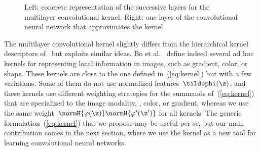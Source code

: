 \begin{figure}
{
      \label{subfig:cnn}
   }
   \vspace*{-0.3cm}
   \caption{Left: concrete representation of the successive layers for the multilayer convolutional kernel. Right: one layer of the convolutional neural network that approximates the kernel.
   }\label{fig:sketch}
\end{figure}

The multilayer convolutional kernel slightly differs from the hierarchical kernel descriptors
of~\cite{bo2011} but exploits similar ideas. Bo et al.~\cite{bo2011} define
indeed several ad hoc kernels for representing local information in images,
such as gradient, color, or shape. These kernels are close to the one
defined in~(\ref{eq:kernel}) but with a few variations. Some of them do not
use normalized features~$\tildephi(\z)$, and these kernels use different
weighting strategies for the summands of~(\ref{eq:kernel}) that are specialized
to the image modality, \eg, color, or gradient, whereas we use the same
weight~$\normH{\varphi(\z)}  \normH{\varphi'(\z')}$ for all kernels. The generic
formulation~(\ref{eq:kernel}) that we propose may be useful per
se, but our main contribution comes in the next section, where we use the  
kernel as a new tool for learning convolutional neural networks.

